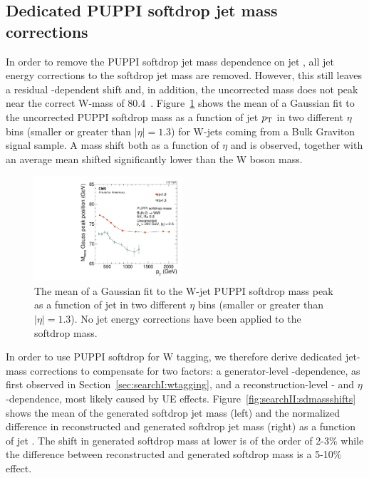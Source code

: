 \subsection{Dedicated PUPPI softdrop jet mass corrections}
\label{sec:searchII:masscorr}
In order to remove the PUPPI softdrop jet mass dependence on jet \PT, all jet energy corrections to the softdrop jet mass are removed. However, this still leaves a residual \PT-dependent shift and, in addition, the uncorrected mass does not peak near the correct W-mass of 80.4~\GeV. Figure~\ref{fig:searchII:UncorrSD} shows the mean of a Gaussian fit to the uncorrected PUPPI softdrop mass as a function of jet $p_{\mathrm{T}}$ in two different $\eta$ bins (smaller or greater than $|\eta|=1.3$) for W-jets coming from a Bulk Graviton signal sample. A mass shift both as a function of $\eta$ and \PT is observed, together with an average mean shifted significantly lower than the W boson mass.
\begin{figure}[h!]
\centering
\includegraphics[width=0.49\textwidth]{figures/analysis/search2/AN-16-235/plots/RecoPuppiSoftdropMass_vspt.pdf}
\caption{The mean of a Gaussian fit to the W-jet PUPPI softdrop mass peak as a function of jet \PT in two different $\eta$ bins (smaller or greater than $|\eta|=1.3$). No jet energy corrections have been applied to the softdrop mass.}
\label{fig:searchII:UncorrSD}
\end{figure}
In order to use PUPPI softdrop for W tagging, we therefore derive dedicated jet-mass corrections to compensate for two factors: a generator-level \PT-dependence, as first observed in Section~\ref{sec:searchI:wtagging}, and a reconstruction-level \PT- and $\eta$-dependence, most likely caused by UE effects. Figure~\ref{fig:searchII:sdmassshifts} shows the mean of the generated softdrop jet mass (left) and the normalized difference in reconstructed and generated softdrop jet mass (right) as a function of jet \PT. The shift in generated softdrop mass at lower \PT is of the order of 2-3$\%$ while the difference between reconstructed and generated softdrop mass is a 5-10$\%$ effect.
